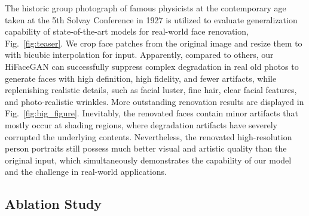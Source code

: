 \documentclass[sigconf]{acmart}
\begin{document}
The historic group photograph of famous physicists at the contemporary age taken at the 5th Solvay Conference in 1927 is utilized to evaluate generalization capability of state-of-the-art models for real-world face renovation, Fig.~\ref{fig:teaser}. We crop  face patches from the original image and resize them to  with bicubic interpolation for input. Apparently, compared to others, our HiFaceGAN can successfully suppress complex degradation in real old photos to generate faces with high definition, high fidelity, and fewer artifacts, while replenishing realistic details, such as facial luster, fine hair, clear facial features, and photo-realistic wrinkles. More outstanding renovation results are displayed in Fig.~\ref{fig:big_figure}. Inevitably, the renovated faces contain minor artifacts that mostly occur at shading regions, where degradation artifacts have severely corrupted the underlying contents. Nevertheless, the renovated high-resolution person portraits still possess much better visual and artistic quality than the original input, which simultaneously demonstrates the capability of our model and the challenge in real-world applications.

\subsection{Ablation Study}\label{sec:ablation}

\begin{table}[!t]
	\centering
	\caption{Ablation study results on 16x face hallucination.}
	\label{tab:ablation}
\end{table}
\end{document}
